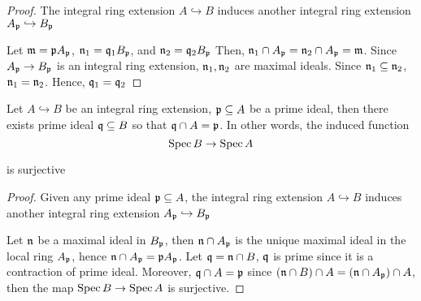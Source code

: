 \begin{proof}
	The integral ring extension $A \hookrightarrow B$ induces another integral ring extension $A_{\mathfrak{p}} \hookrightarrow B_{\mathfrak{p}}$
	
	\begin{center}
	\end{center}
	Let $\mathfrak{m} = \mathfrak{p} A_{\mathfrak{p}}$, $\mathfrak{n}_1 = \mathfrak{q}_1 B_{\mathfrak{p}}$, and $\mathfrak{n}_2 = \mathfrak{q}_2 B_{\mathfrak{p}}$ Then, $\mathfrak{n}_1 \cap A_{\mathfrak{p}} = \mathfrak{n}_2 \cap A_{\mathfrak{p}} = \mathfrak{m}$. Since $A_{\mathfrak{p}} \to B_{\mathfrak{p}}$ is an integral ring extension, $\mathfrak{n}_1, \mathfrak{n}_2$ are maximal ideals. Since $\mathfrak{n}_1 \subseteq \mathfrak{n}_2$, $\mathfrak{n}_1 = \mathfrak{n}_2$. Hence, $\mathfrak{q}_1 = \mathfrak{q}_2$
\end{proof}

\begin{theorem}
	Let $A \hookrightarrow B$ be an integral ring extension, $\mathfrak{p} \subseteq A$ be a prime ideal, then there exists prime ideal $\mathfrak{q} \subseteq B$ so that $\mathfrak{q} \cap A = \mathfrak{p}$. In other words, the induced function
	$$
		\operatorname{Spec} B \to \operatorname{Spec} A
	$$
	
	is surjective
\end{theorem}

\begin{proof}
	Given any prime ideal $\mathfrak{p} \subseteq A$, the integral ring extension $A \hookrightarrow B$ induces another integral ring extension $A_{\mathfrak{p}} \hookrightarrow B_{\mathfrak{p}}$
	\begin{center}
	\end{center}
	
	Let $\mathfrak{n}$ be a maximal ideal in $B_{\mathfrak{p}}$, then $\mathfrak{n} \cap A_{\mathfrak{p}}$ is the unique maximal ideal in the local ring $A_{\mathfrak{p}}$, hence $\mathfrak{n} \cap A_{\mathfrak{p}} = \mathfrak{p} A_{\mathfrak{p}}$. Let $\mathfrak{q} = \mathfrak{n} \cap B$, $\mathfrak{q}$ is prime since it is a contraction of prime ideal. Moreover, $\mathfrak{q} \cap A = \mathfrak{p}$ since $(\mathfrak{n} \cap B) \cap A = (\mathfrak{n} \cap A_{\mathfrak{p}}) \cap A$, then the map $\operatorname{Spec} B \to \operatorname{Spec} A$ is surjective.	
\end{proof}

